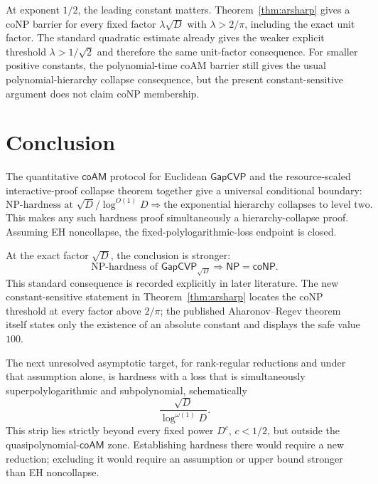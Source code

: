 \documentclass[11pt]{article}
\newcommand{\GapCVP}{\mathsf{GapCVP}}
\newcommand{\coAM}{\mathsf{coAM}}
\begin{document}
At exponent $1/2$, the leading constant matters.  Theorem~\ref{thm:arsharp}
gives a coNP barrier for every fixed factor
$\lambda\sqrt D$ with $\lambda>2/\pi$, including the exact unit factor.
The standard quadratic estimate already gives the weaker explicit threshold
$\lambda>1/\sqrt2$ and therefore the same unit-factor consequence.
For smaller positive constants, the polynomial-time coAM barrier still gives
the usual polynomial-hierarchy collapse consequence, but the present
constant-sensitive argument does not claim coNP membership.

\section{Conclusion}

The quantitative $\coAM$ protocol for Euclidean $\GapCVP$ and the
resource-scaled interactive-proof collapse theorem together give a universal
conditional boundary:
\[
  \boxed{
  \text{NP-hardness at }\sqrt D/\log^{O(1)}D
  \Longrightarrow
  \text{the exponential hierarchy collapses to level two}.}
\]
This makes any such hardness proof simultaneously a hierarchy-collapse proof.
Assuming EH noncollapse, the fixed-polylogarithmic-loss endpoint is closed.

At the exact factor $\sqrt D$, the conclusion is stronger:
\[
  \boxed{
  \text{NP-hardness of }\GapCVP_{\sqrt D}
  \Longrightarrow \mathsf{NP}=\mathsf{coNP}.}
\]
This standard consequence is recorded explicitly in later literature.  The
new constant-sensitive statement in Theorem~\ref{thm:arsharp} locates the
coNP threshold at every factor above $2/\pi$; the published
Aharonov--Regev theorem itself states only the existence of an absolute
constant and displays the safe value $100$.

The next unresolved asymptotic target, for rank-regular reductions and under
that assumption alone, is hardness with a loss that is simultaneously
superpolylogarithmic and subpolynomial, schematically
\[
  \frac{\sqrt D}{\log^{\omega(1)}D}.
\]
This strip lies strictly beyond every fixed power $D^c$, $c<1/2$, but outside
the quasipolynomial-$\coAM$ zone.  Establishing hardness there would require a
new reduction; excluding it would require an assumption or upper bound
stronger than EH noncollapse.

{\small


}
\end{document}
